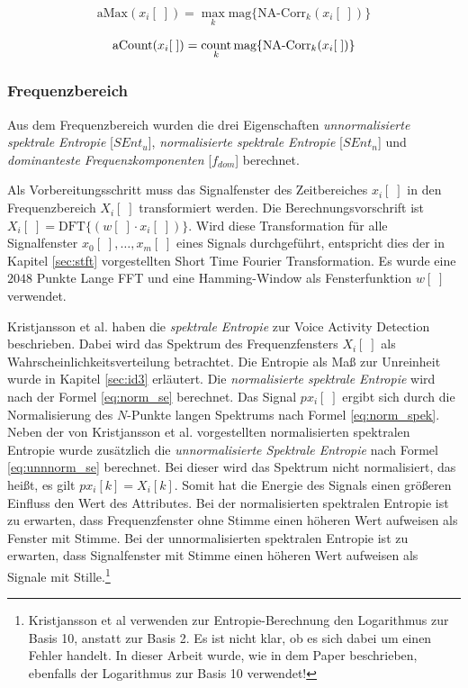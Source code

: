\begin{equation}
\text{aMax}(x_i[\;]) = \max_{k}\text{mag}\{\text{NA-Corr}_k(x_i[\;])\}
\label{eq:corrpeak}
\end{equation}

\begin{equation}
\text{aCount}(x_i[\;]) = \operatorname*{count}_{k}\text{mag}\{\text{NA-Corr}_k(x_i[\;])\}
\label{eq:corrcount}
\end{equation}


\subsubsection{Frequenzbereich}

Aus dem Frequenzbereich wurden die drei Eigenschaften \emph{unnormalisierte spektrale Entropie} [$SEnt_{u}$], \emph{normalisierte spektrale Entropie}  [$SEnt_{n}$] und \emph{dominanteste Frequenzkomponenten} [$f_{dom}$] berechnet.

Als Vorbereitungsschritt muss das Signalfenster des Zeitbereiches $x_i[\;]$ in den Frequenzbereich $X_i[\;]$ transformiert werden. Die Berechnungsvorschrift ist $X_i[\;] = \text{DFT}\{(w[\;] \cdot x_i[\;])\}$. Wird diese Transformation für alle Signalfenster $x_0[\;], \ldots, x_m[\;]$ eines Signals durchgeführt, entspricht dies der in Kapitel \ref{sec:stft} vorgestellten Short Time Fourier Transformation. Es wurde eine $2048$ Punkte Lange FFT und eine Hamming-Window als Fensterfunktion $w[\;]$ verwendet.

Kristjansson et al. \cite[S. 2]{vad_Lisboa} haben die \emph{spektrale Entropie} zur Voice Activity Detection beschrieben. Dabei wird das Spektrum des Frequenzfensters $X_i[\;]$ als Wahrscheinlichkeitsverteilung betrachtet. Die Entropie als Maß zur \glqq Unreinheit\grqq{} wurde in Kapitel \ref{sec:id3} erläutert. Die \emph{normalisierte spektrale Entropie} wird nach der Formel \ref{eq:norm_se} berechnet. Das Signal $px_i[\;]$ ergibt sich durch die Normalisierung des $N$-Punkte langen Spektrums nach Formel \ref{eq:norm_spek}. Neben der von Kristjansson et al. \cite{vad_Lisboa} vorgestellten normalisierten spektralen Entropie wurde zusätzlich die \emph{unnormalisierte Spektrale Entropie} nach Formel \ref{eq:unnnorm_se} berechnet. Bei dieser wird das Spektrum nicht normalisiert, das heißt, es gilt $px_i[k] = X_i[k]$. Somit hat die Energie des Signals einen größeren Einfluss den Wert des Attributes. Bei der normalisierten spektralen Entropie ist zu erwarten, dass Frequenzfenster ohne Stimme einen höheren Wert aufweisen als Fenster mit Stimme. Bei der unnormalisierten spektralen Entropie ist zu erwarten, dass Signalfenster mit Stimme einen höheren Wert aufweisen als Signale mit Stille.\footnote{Kristjansson et al \cite[S. 2]{vad_Lisboa} verwenden zur Entropie-Berechnung den Logarithmus zur Basis 10, anstatt zur Basis 2. Es ist nicht klar, ob es sich dabei um einen Fehler handelt. In dieser Arbeit wurde, wie in dem Paper beschrieben, ebenfalls der Logarithmus zur Basis 10 verwendet!}

